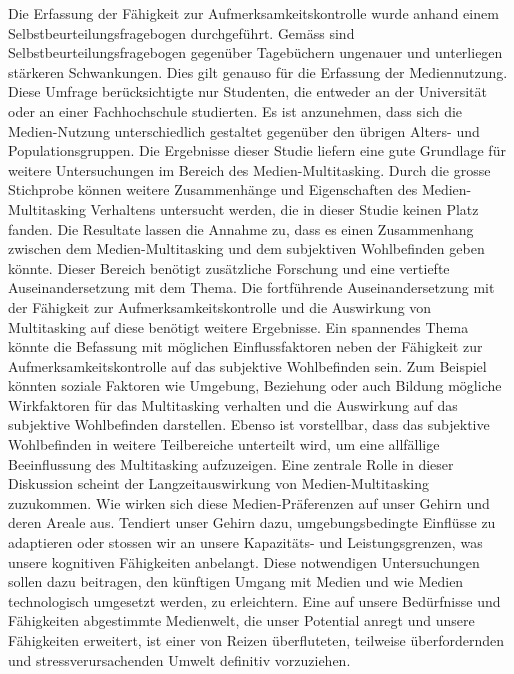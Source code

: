 Die Erfassung der Fähigkeit zur Aufmerksamkeitskontrolle wurde anhand einem Selbstbeurteilungsfragebogen durchgeführt. Gemäss  sind Selbstbeurteilungsfragebogen gegenüber Tagebüchern ungenauer und unterliegen stärkeren Schwankungen. Dies gilt genauso für die Erfassung der Mediennutzung.\\
Diese Umfrage berücksichtigte nur Studenten, die entweder an der Universität oder an einer Fachhochschule studierten. Es ist anzunehmen, dass sich die Medien-Nutzung unterschiedlich gestaltet gegenüber den übrigen Alters- und Populationsgruppen. 
\label{section.diskussion.ausblick}
Die Ergebnisse dieser Studie liefern eine gute Grundlage für weitere Untersuchungen im Bereich des Medien-Multitasking. Durch die grosse Stichprobe können weitere Zusammenhänge und Eigenschaften des Medien-Multitasking Verhaltens untersucht werden, die in dieser Studie keinen Platz fanden. Die Resultate lassen die Annahme zu, dass es einen Zusammenhang zwischen dem Medien-Multitasking und dem subjektiven Wohlbefinden geben könnte. Dieser Bereich benötigt zusätzliche Forschung und eine vertiefte Auseinandersetzung mit dem Thema. Die fortführende Auseinandersetzung mit der Fähigkeit zur Aufmerksamkeitskontrolle und die Auswirkung von Multitasking auf diese benötigt weitere Ergebnisse. Ein spannendes Thema könnte die Befassung mit möglichen Einflussfaktoren neben der Fähigkeit zur Aufmerksamkeitskontrolle auf das subjektive Wohlbefinden sein. Zum Beispiel könnten soziale Faktoren wie Umgebung, Beziehung oder auch Bildung mögliche Wirkfaktoren für das Multitasking verhalten und die Auswirkung auf das subjektive Wohlbefinden darstellen. Ebenso ist vorstellbar, dass das subjektive Wohlbefinden in weitere Teilbereiche unterteilt wird, um eine allfällige Beeinflussung des Multitasking aufzuzeigen. Eine zentrale Rolle in dieser Diskussion scheint der Langzeitauswirkung von Medien-Multitasking zuzukommen. Wie wirken sich diese Medien-Präferenzen auf unser Gehirn und deren Areale aus. Tendiert unser Gehirn dazu, umgebungsbedingte Einflüsse zu adaptieren oder stossen wir an unsere Kapazitäts- und Leistungsgrenzen, was unsere kognitiven Fähigkeiten anbelangt. Diese notwendigen Untersuchungen sollen dazu beitragen, den künftigen Umgang mit Medien und wie Medien technologisch umgesetzt werden, zu erleichtern. Eine auf unsere Bedürfnisse und Fähigkeiten abgestimmte Medienwelt, die unser Potential anregt und unsere Fähigkeiten erweitert, ist einer von Reizen überfluteten, teilweise überfordernden und stressverursachenden Umwelt definitiv vorzuziehen. 

